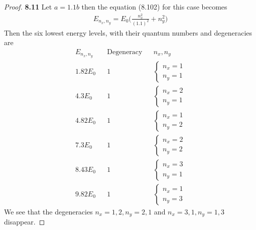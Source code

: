 \documentclass[11pt]{article}
\theoremstyle{definition}
\begin{document}
\cleardoublepage
\begin{proof}{\textbf{8.11}}
Let $a = 1.1b$ then the equation (8.102) for this case becomes
\begin{align*}
    E_{n_x,n_y} = E_0\bigg(\frac{n_x^2}{(1.1)^2} + n_y^2\bigg)
\end{align*}
Then the six lowest energy levels, with their quantum numbers and degeneracies
are
\begin{align*}
    E_{n_x, n_y} & &\text{Degeneracy}& &n_x, n_y\\
    1.82E_0&  &1&  &\begin{cases} n_x = 1\\ n_y = 1 \end{cases}\\
    4.3E_0&  &1&  &\begin{cases} n_x = 2\\ n_y = 1 \end{cases}\\
    4.82E_0&  &1&  &\begin{cases} n_x = 1\\ n_y = 2 \end{cases}\\
    7.3E_0&  &1&  &\begin{cases} n_x = 2\\ n_y = 2 \end{cases}\\
    8.43E_0&  &1&  &\begin{cases} n_x = 3\\ n_y = 1 \end{cases}\\
    9.82E_0&  &1&  &\begin{cases} n_x = 1\\ n_y = 3 \end{cases}   
\end{align*}
We see that the degeneracies $n_x = 1,2, n_y = 2,1$ and $n_x = 3,1, n_y = 1,3$
disappear.
\end{proof}
\end{document}
